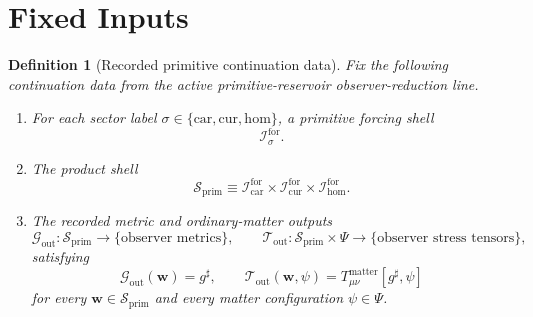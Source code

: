 \documentclass[11pt]{article}
\newcommand{\CompletedMetric}{g^{\sharp}}
\newcommand{\MatterSpace}{\Psi}
\newcommand{\Car}{\mathrm{car}}
\newcommand{\Cur}{\mathrm{cur}}
\newcommand{\Hom}{\mathrm{hom}}
\newcommand{\ForSpace}[1]{\mathcal I_{#1}^{\mathrm{for}}}
\newcommand{\PrimShell}{\mathcal S_{\mathrm{prim}}}
\newcommand{\MetricOut}{\mathscr G_{\mathrm{out}}}
\newcommand{\MatterOut}{\mathscr T_{\mathrm{out}}}
\newtheorem{definition}{Definition}
\begin{document}
\section{Fixed Inputs}

\begin{definition}[Recorded primitive continuation data]
\label{def:fixed}
Fix the following continuation data from the active primitive-reservoir observer-reduction line.
\begin{enumerate}
    \item For each sector label \(\sigma\in\{\Car,\Cur,\Hom\}\), a primitive forcing shell
    \[
    \ForSpace{\sigma}.
    \]
    \item The product shell
    \[
    \PrimShell
    \equiv
    \ForSpace{\Car}\times \ForSpace{\Cur}\times \ForSpace{\Hom}.
    \]
    \item The recorded metric and ordinary-matter outputs
    \[
    \MetricOut:\PrimShell\to\{\text{observer metrics}\},
    \qquad
    \MatterOut:\PrimShell\times\MatterSpace\to\{\text{observer stress tensors}\},
    \]
    satisfying
    \begin{equation}
    \MetricOut(\mathbf w)=\CompletedMetric,
    \qquad
    \MatterOut(\mathbf w,\psi)
    =
    T_{\mu\nu}^{\mathrm{matter}}[\CompletedMetric,\psi]
    \label{eq:fixedoutputs}
    \end{equation}
    for every \(\mathbf w\in\PrimShell\) and every matter configuration \(\psi\in\MatterSpace\).
\end{enumerate}
\end{definition}
\end{document}
